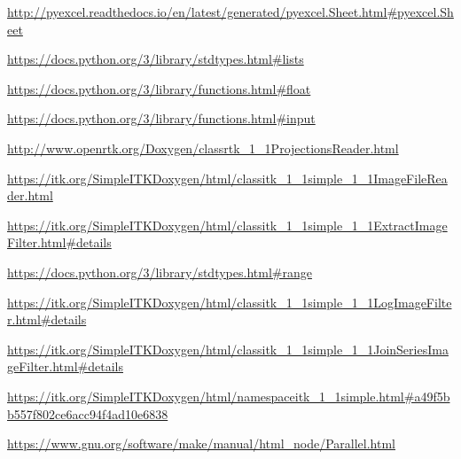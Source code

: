 \documentclass[a4paper,12pt, doubleside]{report}
\begin{document}
\begin{thebibliography}{1}
        \url{http://pyexcel.readthedocs.io/en/latest/generated/pyexcel.Sheet.html#pyexcel.Sheet}
        
        \url{https://docs.python.org/3/library/stdtypes.html#lists}
        
        \url{https://docs.python.org/3/library/functions.html#float}
        
        \url{https://docs.python.org/3/library/functions.html#input}
        
        \url{http://www.openrtk.org/Doxygen/classrtk_1_1ProjectionsReader.html}
    
        \url{https://itk.org/SimpleITKDoxygen/html/classitk_1_1simple_1_1ImageFileReader.html}
    
        \url{https://itk.org/SimpleITKDoxygen/html/classitk_1_1simple_1_1ExtractImageFilter.html#details}
    
        \url{https://docs.python.org/3/library/stdtypes.html#range}
        
        \url{https://itk.org/SimpleITKDoxygen/html/classitk_1_1simple_1_1LogImageFilter.html#details}
        
        \url{https://itk.org/SimpleITKDoxygen/html/classitk_1_1simple_1_1JoinSeriesImageFilter.html#details}
        
        \url{https://itk.org/SimpleITKDoxygen/html/namespaceitk_1_1simple.html#a49f5bb557f802ce6acc94f4ad10e6838}
        
        \url{https://www.gnu.org/software/make/manual/html_node/Parallel.html}
    
    \end{thebibliography}
\end{document}

